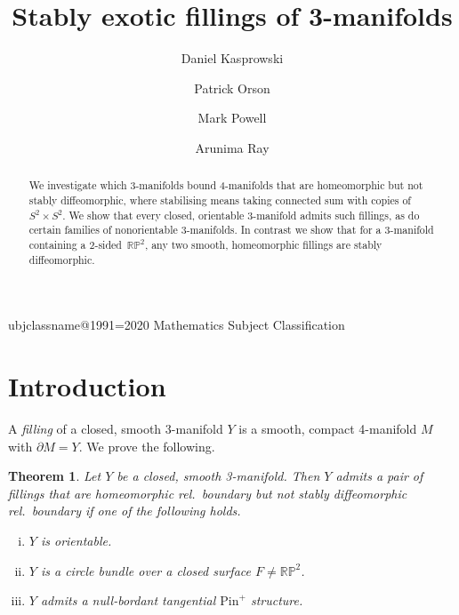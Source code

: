 \documentclass[a4paper, reqno]{amsart}
\newtheorem{theorem}[proposition]{Theorem}
\theoremstyle{definition}
\theoremstyle{remark}
\newcommand{\pinplus}{{\mathrm{Pin}^+}\!}
\newcommand{\RP}{\mathbb{RP}}
\begin{document}
\title{Stably exotic fillings of 3-manifolds}

\author{Daniel Kasprowski}
\address{School of Mathematical Sciences, University of Southampton, United Kingdom}

\author{Patrick Orson}
\address{Department of Mathematics, California Polytechnic State University, San Luis Obispo, USA}

\author{Mark Powell}
\address{School of  Mathematics and Statistics, University of Glasgow, United Kingdom}

\author{Arunima Ray}
\address{School of Mathematics and Statistics, The University of Melbourne, Australia}

\def\subjclassname{\textup{2020} Mathematics Subject Classification}
\expandafter\let\csname subjclassname@1991\endcsname=\subjclassname
{}

\begin{abstract}
We investigate which 3-manifolds bound 4-manifolds that are homeomorphic but not stably diffeomorphic, where stabilising means taking connected sum with copies of $S^2\times S^2$. We show that every closed, orientable 3-manifold admits such fillings, as do certain families of nonorientable 3-manifolds. In contrast we show that for a 3-manifold containing a 2-sided~$\RP^2$, any two smooth, homeomorphic fillings are stably diffeomorphic. 
\end{abstract}

\maketitle

\section{Introduction}

A \emph{filling} of a closed, smooth 3-manifold $Y$ is a smooth, compact 4-manifold $M$ with $\partial M = Y$. We prove the following. 

\begin{theorem}\label{thm:some-stably-exotic-fillings-exist}
Let $Y$ be a closed, smooth 3-manifold. Then $Y$ admits a pair of fillings that are homeomorphic rel.\ boundary but not stably diffeomorphic rel.\ boundary if one of the following holds.
  \begin{enumerate}[(i)]
    \item\label{main-thm-item-i} $Y$ is orientable.  
    \item\label{main-thm-item-ii} $Y$ is a circle bundle over a closed %
    surface $F \neq \RP^2$. 
    \item\label{main-thm-item-iii} $Y$ admits a null-bordant tangential $\pinplus$ structure. 
   \end{enumerate}
 \end{theorem}
\end{document}
